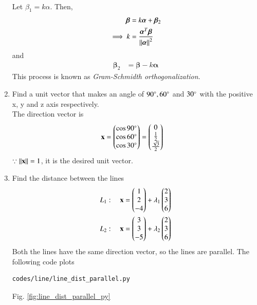 \begin{enumerate}[label=\arabic*.,ref=\thesubsection.\theenumi]
%
\label{prob:line_gram_schmidt}
\\
\solution Let $\beta_1 = k\alpha$.  Then, 
%
\begin{align}
\bm{\beta} &= k\bm{\alpha}+\bm{\beta}_2
\\
\implies k &= \frac{\bm{\alpha}^T\bm{\beta}}{\left\lVert\bm{\alpha}\right\rVert^2}
\end{align}
%
and 
%
\begin{align}
\bm{\beta}_2 &= \bm{\beta}-k\bm{\alpha}
\end{align}
%
This process is known as {\em Gram-Schmidth orthogonalization}.
\item Find a unit vector that makes an angle of $90\degree, 60\degree$ and $30\degree$ with the positive x, y and z axis respectively.
%
\\
\solution
The direction vector is
%
\begin{align}
\label{eq:line_dir_cos}
\mathbf{x} &= \begin{pmatrix}\cos 90\degree\\\cos 60\degree \\ \cos 30\degree\end{pmatrix} = \begin{pmatrix}0 \\ \frac{1}{2}\\\frac{\sqrt{3}}{2}\end{pmatrix}
\end{align}
%
$\because \left\lVert\mathbf{x}\right\rVert=1$, it is the desired unit vector.
%
\item Find the 
distance between the lines 
\begin{align}
L_1: \quad \mathbf{x} &= \begin{pmatrix}1\\2\\-4\end{pmatrix} + \lambda_1\begin{pmatrix}2 \\ 3 \\6\end{pmatrix}
\\
L_2: \quad \mathbf{x} &= \begin{pmatrix}3\\3\\-5\end{pmatrix} + \lambda_2\begin{pmatrix}2 \\ 3 \\6\end{pmatrix}
\end{align}
\label{prob:line_dist_parallel}
%
\solution Both the lines have the same direction vector, so the lines are parallel. 
The following code plots 
%
\begin{lstlisting}
codes/line/line_dist_parallel.py
\end{lstlisting}
Fig. \ref{fig:line_dist_parallel_py} 
%
\begin{figure}[!ht]

\end{figure}
\end{enumerate}
